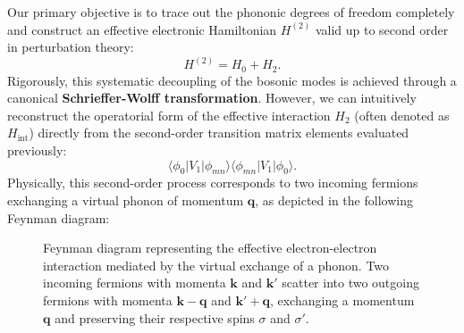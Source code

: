 Our primary objective is to trace out the phononic degrees of freedom completely and construct an effective electronic Hamiltonian \( H^{(2)} \) valid up to second order in perturbation theory:
\[
    H^{(2)} = H_0 + H_2.
\]
Rigorously, this systematic decoupling of the bosonic modes is achieved through a canonical \textbf{Schrieffer-Wolff transformation}. However, we can intuitively reconstruct the operatorial form of the effective interaction \( H_2 \) (often denoted as \( H_{\text{int}} \)) directly from the second-order transition matrix elements evaluated previously:
\[
    \langle \phi_0 | V_1 | \phi_{mn} \rangle \langle \phi_{mn} | V_1 | \phi_0 \rangle.
\]
Physically, this second-order process corresponds to two incoming fermions exchanging a virtual phonon of momentum \( \mathbf{q} \), as depicted in the following Feynman diagram:

\begin{figure}[H]
    \centering
    \caption{Feynman diagram representing the effective electron-electron interaction mediated by the virtual exchange of a phonon. Two incoming fermions with momenta \(\mathbf{k}\) and \(\mathbf{k}'\) scatter into two outgoing fermions with momenta \(\mathbf{k} - \mathbf{q}\) and \(\mathbf{k}' + \mathbf{q}\), exchanging a momentum \(\mathbf{q}\) and preserving their respective spins \(\sigma\) and \(\sigma'\).}
    \label{fig:bcs_scattering}
\end{figure}

